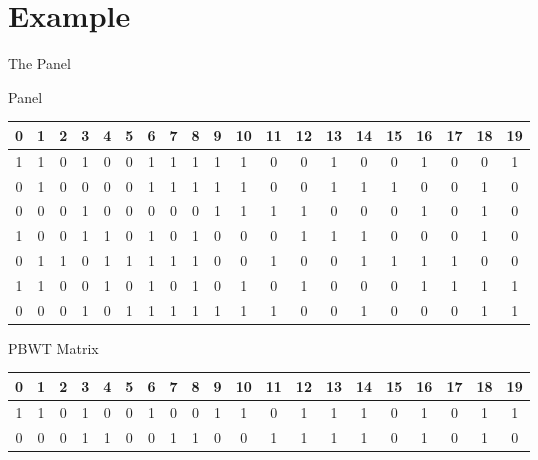 \documentclass{beamer}
\begin{document}
\section{Example}
\begin{frame}{The Panel}
  \begin{block}{Panel}
    \begin{table}[H]
      \centering
      \tiny
      \begin{tabular}{c|c|c|c|c|c|c|c|c|c|c|c|c|c|c|c|c|c|c|c}
        \hline
        0 & 1 & 2 & 3 & 4 & 5 & 6 & 7 & 8 & 9 & 10 & 11 & 12 & 13 & 14 & 15 & 16
        & 17 & 18 & 19\\
        \hline
        \hline
        
        1 & 1 & 0 & 1 & 0 & 0 & 1 & 1 & 1 & 1 & 1 & 0 & 0 & 1 & 0 & 0 & 1 & 0
             & 0 & 1\\
        0 & 1 & 0 & 0 & 0 & 0 & 1 & 1 & 1 & 1 & 1 & 0 & 0 & 1 & 1 & 1 & 0 & 0
             & 1 & 0\\
        0 & 0 & 0 & 1 & 0 & 0 & 0 & 0 & 0 & 1 & 1 & 1 & 1 & 0 & 0 & 0 & 1 & 0
             & 1 & 0\\
        1 & 0 & 0 & 1 & 1 & 0 & 1 & 0 & 1 & 0 & 0 & 0 & 1 & 1 & 1 & 0 & 0 & 0
             & 1 & 0\\
        0 & 1 & 1 & 0 & 1 & 1 & 1 & 1 & 1 & 0 & 0 & 1 & 0 & 0 & 1 & 1 & 1 & 1
             & 0 & 0\\
        1 & 1 & 0 & 0 & 1 & 0 & 1 & 0 & 1 & 0 & 1 & 0 & 1 & 0 & 0 & 0 & 1 & 1
             & 1 & 1\\
        0 & 0 & 0 & 1 & 0 & 1 & 1 & 1 & 1 & 1 & 1 & 1 & 0 & 0 & 1 & 0 & 0 & 0
             & 1 & 1\\
        \hline
      \end{tabular}
    \end{table}
  \end{block}
  \begin{block}{PBWT Matrix}
    \begin{table}[H]
      \centering
      \tiny
      \begin{tabular}{c|c|c|c|c|c|c|c|c|c|c|c|c|c|c|c|c|c|c|c}
        \hline
        0 & 1 & 2 & 3 & 4 & 5 & 6 & 7 & 8 & 9 & 10 & 11 & 12 & 13 & 14 & 15 & 16
        & 17 & 18 & 19\\
        \hline
        \hline
        1 & 1 & 0 & 1 & 0 & 0 & 1 & 0 & 0 & 1 & 1 & 0 & 1 & 1 & 1 & 0 & 1 & 0
             & 1 & 1 \\
        0 & 0 & 0 & 1 & 1 & 0 & 0 & 1 & 1 & 0 & 0 & 1 & 1 & 1 & 1 & 0 & 1 & 0
             & 1 & 0 \\

\end{tabular}
\end{table}
\end{block}
\end{frame}
\end{document}
